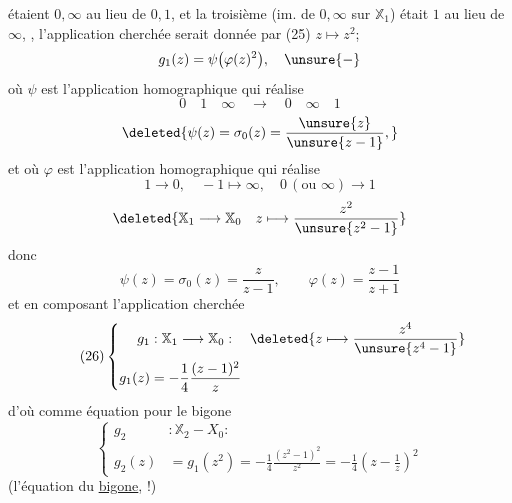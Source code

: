  étaient $0,\infty$ au lieu de $0,1$, et la troisième  (im.  de $0,\infty$ sur $\mathbb X_1$) était $1$ au lieu de $\infty$,
, l'application cherchée serait donnée par (25) $z\longmapsto z^2$;
\[
g_1(z)=\psi\bigl(\varphi(z)^2\bigr),\quad\unsure{-}
\]
où $\psi$ est l'application homographique qui réalise
\[
0\quad1\quad\infty\quad\longrightarrow\quad0\quad\infty\quad1
\]
\[
\deleted{\psi(z)=\sigma_0(z)=\frac{\unsure{z}}{\unsure{z-1}},}
\]
et où $\varphi$ est l'application homographique qui réalise
\[
1\longrightarrow0,\quad-1\longmapsto\infty,\quad0\,(\text{ou }\infty)\longrightarrow1
\]
\[
\deleted{\mathbb X_1\longrightarrow\mathbb X_0\quad z\longmapsto\frac{z^2}{\unsure{z^2-1}}}
\]
donc
\[
\psi(z)=\sigma_0(z)=\frac{z}{z-1},\qquad\varphi(z)=\frac{z-1}{z+1}
\]
et en composant l'application cherchée
\[
\tag{26}
\left\{\begin{aligned}
g_1&:\mathbb X_1\longrightarrow\mathbb X_0:\quad\deleted{z\longmapsto\frac{z^4}{\unsure{z^4-1}}}\\
g_1(z)&=-\frac14\frac{(z-1)^2}{z}
\end{aligned}\right.
\]
d'où comme équation pour le bigone
\[
\tag{27}
\left\{\begin{aligned}
g_2&:\mathbb X_2\mathrel{-}X_0:\\
g_2(z)&=g_1(z^2)=-\frac14\frac{(z^2-1)^2}{z^2}=-\frac14\left(z-\frac1z\right)^2
\end{aligned}\right.
\]
(l'équation du \uline{bigone},  !)

